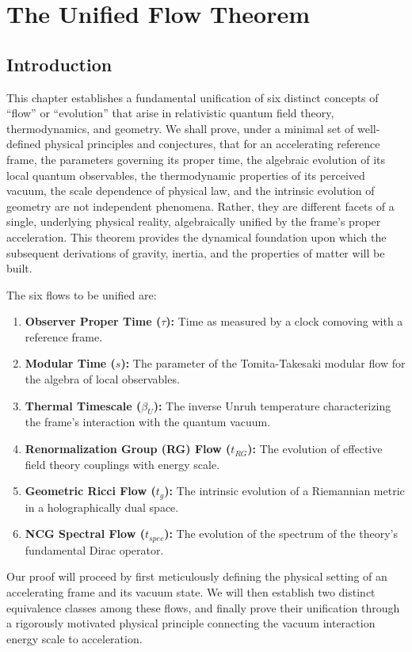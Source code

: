 \documentclass[11pt, letterpaper]{report}
\theoremstyle{plain} %
\theoremstyle{definition} %
\theoremstyle{remark} %
\begin{document}

\chapter{The Unified Flow Theorem}
\label{chap:unified_flow}

\section{Introduction}
\label{sec:ch1_intro}

This chapter establishes a fundamental unification of six distinct concepts of ``flow'' or ``evolution'' that arise in relativistic quantum field theory, thermodynamics, and geometry. We shall prove, under a minimal set of well-defined physical principles and conjectures, that for an accelerating reference frame, the parameters governing its proper time, the algebraic evolution of its local quantum observables, the thermodynamic properties of its perceived vacuum, the scale dependence of physical law, and the intrinsic evolution of geometry are not independent phenomena. Rather, they are different facets of a single, underlying physical reality, algebraically unified by the frame's proper acceleration. This theorem provides the dynamical foundation upon which the subsequent derivations of gravity, inertia, and the properties of matter will be built.

The six flows to be unified are:
\begin{enumerate}
    \item \textbf{Observer Proper Time ($\tau$):} Time as measured by a clock comoving with a reference frame.
    \item \textbf{Modular Time ($s$):} The parameter of the Tomita-Takesaki modular flow for the algebra of local observables.
    \item \textbf{Thermal Timescale ($\beta_U$):} The inverse Unruh temperature characterizing the frame's interaction with the quantum vacuum.
    \item \textbf{Renormalization Group (RG) Flow ($t_{RG}$):} The evolution of effective field theory couplings with energy scale.
    \item \textbf{Geometric Ricci Flow ($t_g$):} The intrinsic evolution of a Riemannian metric in a holographically dual space.
    \item \textbf{NCG Spectral Flow ($t_{spec}$):} The evolution of the spectrum of the theory's fundamental Dirac operator.
\end{enumerate}
Our proof will proceed by first meticulously defining the physical setting of an accelerating frame and its vacuum state. We will then establish two distinct equivalence classes among these flows, and finally prove their unification through a rigorously motivated physical principle connecting the vacuum interaction energy scale to acceleration.
\end{document}
